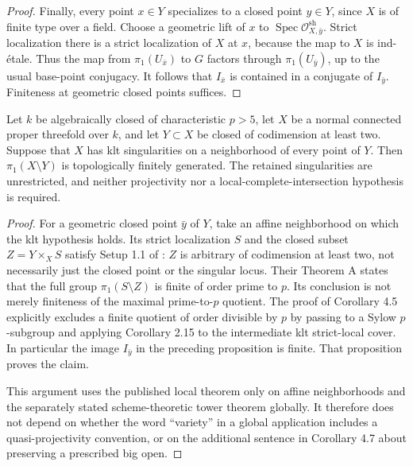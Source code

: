 \begin{proof}
Finally, every point $x\in Y$ specializes to a closed point
$y\in Y$, since $X$ is of finite type over a field.  Choose a
geometric lift of $x$ to
$\operatorname{Spec}\mathcal O^{\mathrm{sh}}_{X,\bar y}$.
Strict localization there is a strict localization of $X$ at
$x$, because the map to $X$ is ind-\'etale.  Thus the map
from $\pi_1(U_{\bar x})$ to $G$ factors through
$\pi_1(U_{\bar y})$, up to the usual base-point conjugacy.
It follows that $I_{\bar x}$ is contained in a conjugate of
$I_{\bar y}$.  Finiteness at geometric closed points suffices.
\end{proof}

\begin{corollary}
\label{D:klt-threefold-boundary}
Let $k$ be algebraically closed of characteristic $p>5$, let
$X$ be a normal connected proper threefold over $k$, and let
$Y\subset X$ be closed of codimension at least two.  Suppose
that $X$ has klt singularities on a neighborhood of every
point of $Y$.  Then $\pi_1(X\setminus Y)$ is topologically
finitely generated.  The retained singularities are unrestricted,
and neither projectivity nor a local-complete-intersection
hypothesis is required.
\end{corollary}
\begin{proof}
For a geometric closed point $\bar y$ of $Y$, take an affine
neighborhood on which the klt hypothesis holds.  Its strict
localization $S$ and the closed subset $Z=Y\times_X S$ satisfy
Setup 1.1 of \cite[p.~694]{CarvajalRojasStabler2023D}:
$Z$ is arbitrary of codimension at least two, not necessarily
just the closed point or the singular locus.  Their Theorem A
\cite[p.~695; Theorem 4.3 and Corollary 4.5,
pp.~713--714]{CarvajalRojasStabler2023D} states that the full
group $\pi_1(S\setminus Z)$ is finite of order prime to $p$.
Its conclusion is not merely finiteness of the maximal
prime-to-$p$ quotient.  The proof of Corollary 4.5 explicitly
excludes a finite quotient of order divisible by $p$ by passing
to a Sylow $p$-subgroup and applying Corollary 2.15 to the
intermediate klt strict-local cover.  In particular the image
$I_{\bar y}$ in the preceding proposition is finite.
That proposition proves the claim.

This argument uses the published local theorem only on affine
neighborhoods and the separately stated scheme-theoretic tower
theorem globally.  It therefore does not depend on whether the
word ``variety'' in a global application includes a
quasi-projectivity convention, or on the additional sentence
in Corollary 4.7 about preserving a prescribed big open.
\end{proof}
